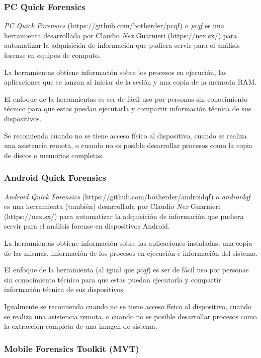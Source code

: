 \documentclass[12pt]{caltech_thesis}
\begin{document}
\subsubsection{PC Quick Forensics}

\textit{PC Quick Forensics} (https://github.com/botherder/pcqf) o \textit{pcqf} es una herramienta desarrollada por Claudio \textit{Nex} Guarnieri (https://nex.sx/) para automatizar la adquisición de información que pudiera servir para el análisis forense en equipos de computo.

La herramientas obtiene información sobre los procesos en ejecución, las aplicaciones que se lanzan al iniciar de la sesión y una copia de la memoria RAM. 

El enfoque de la herramientas es ser de fácil uso por personas sin conocimiento técnico para que estas puedan ejecutarla y compartir información técnica de sus dispositivos.

Se recomienda cuando no se tiene acceso físico al dispositivo, cuando se realiza una asistencia remota, o cuando no es posible desarrollar procesos como la copia de discos o memorias completas.

\subsubsection{Android Quick Forensics}

\textit{Android Quick Forensics} (https://github.com/botherder/androidqf) o \textit{androidqf} es una herramienta (también) desarrollada por Claudio \textit{Nex} Guarnieri (https://nex.sx/) para automatizar la adquisición de información que pudiera servir para el análisis forense en dispositivos Android.

La herramientas obtiene información sobre las aplicaciones instaladas, una copia de las mismas, información de los procesos en ejecución e información del sistema.

El enfoque de la herramienta (al igual que \textit{pcqf}) es ser de fácil uso por personas sin conocimiento técnico para que estas puedan ejecutarla y compartir información técnica de sus dispositivos.

Igualmente se recomienda cuando no se tiene acceso físico al dispositivo, cuando se realiza una asistencia remota, o cuando no es posible desarrollar procesos como la extracción completa de una imagen de sistema.

\subsubsection{Mobile Forensics Toolkit (MVT)}
\end{document}
